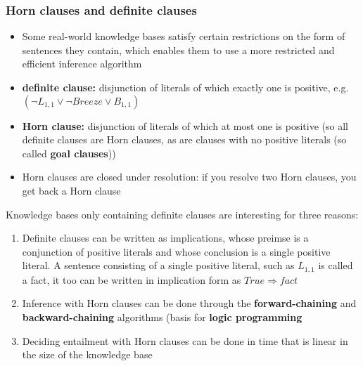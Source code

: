 \documentclass{scrartcl}
\begin{document}
\subsubsection{Horn clauses and definite clauses}
\begin{itemize}
    \item
        Some real-world knowledge bases satisfy certain restrictions on the form of sentences they contain, which enables them to use a more restricted and efficient inference algorithm
    \item
        \textbf{definite clause:} disjunction of literals of which exactly one is positive, e.g. $(\lnot L_{1,1} \lor \lnot Breeze \lor B_{1,1})$
    \item
        \textbf{Horn clause:} disjunction of literals of which at most one is positive (so all definite clauses are Horn clauses, as are clauses with no positive literals (so called \textbf{goal clauses}))
    \item
        Horn clauses are closed under resolution: if you resolve two Horn clauses, you get back a Horn clause
\end{itemize}
Knowledge bases only containing definite clauses are interesting for three reasons:
\begin{enumerate}
    \item
        Definite clauses can be written as implications, whose preimse is a conjunction of positive literals and whose conclusion is a single positive literal. A sentence consisting of a single positive literal, such as $L_{1,1}$ is called a fact, it too can be written in implication form as $True \Rightarrow fact$
    \item
        Inference with Horn clauses can be done through the \textbf{forward-chaining} and \textbf{backward-chaining} algorithms (basis for \textbf{logic programming}
    \item
        Deciding entailment with Horn clauses can be done in time that is linear in the size of the knowledge base
\end{enumerate}
\end{document}
